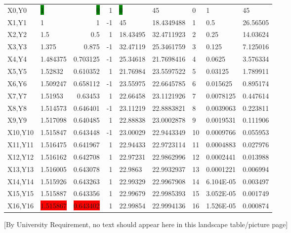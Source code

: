 \begin{landscape}
\begin{table}
\begin{tabular}{|l|l|r|r|l|l|l|l|l|}
    X0,Y0 & \colorbox{green}{1}     & \colorbox{green}{0}     & 1     & \colorbox{green}{0}     & 45    & 0     & 1     & 45 \\
    X1,Y1 & 1     & 1     & -1    & 45    & 18.4349488 & 1     & 0.5   & 26.56505 \\
    X2,Y2 & 1.5   & 0.5   & 1     & 18.43495 & 32.4711923 & 2     & 0.25  & 14.03624 \\
    X3,Y3 & 1.375 & 0.875 & -1    & 32.47119 & 25.3461759 & 3     & 0.125 & 7.125016 \\
    X4,Y4 & 1.484375 & 0.703125 & -1    & 25.34618 & 21.7698416 & 4     & 0.0625 & 3.576334 \\
    X5,Y5 & 1.52832 & 0.610352 & 1     & 21.76984 & 23.5597522 & 5     & 0.03125 & 1.789911 \\
    X6,Y6 & 1.509247 & 0.658112 & -1    & 23.55975 & 22.6645785 & 6     & 0.015625 & 0.895174 \\
    X7,Y7 & 1.51953 & 0.63453 & 1     & 22.66458 & 23.1121926 & 7     & 0.0078125 & 0.447614 \\
    X8,Y8 & 1.514573 & 0.646401 & -1    & 23.11219 & 22.8883821 & 8     & 0.0039063 & 0.223811 \\
    X9,Y9 & 1.517098 & 0.640485 & 1     & 22.88838 & 23.0002878 & 9     & 0.0019531 & 0.111906 \\
    X10,Y10 & 1.515847 & 0.643448 & -1    & 23.00029 & 22.9443349 & 10    & 0.0009766 & 0.055953 \\
    X11,Y11 & 1.516475 & 0.641967 & 1     & 22.94433 & 22.9723114 & 11    & 0.0004883 & 0.027976 \\
    X12,Y12 & 1.516162 & 0.642708 & 1     & 22.97231 & 22.9862996 & 12    & 0.0002441 & 0.013988 \\
    X13,Y13 & 1.516005 & 0.643078 & 1     & 22.9863 & 22.9932937 & 13    & 0.0001221 & 0.006994 \\
    X14,Y14 & 1.515926 & 0.643263 & 1     & 22.99329 & 22.9967908 & 14    & 6.104E-05 & 0.003497 \\
    X15,Y15 & 1.515887 & 0.643356 & 1     & 22.99679 & 22.9985393 & 15    & 3.052E-05 & 0.001749 \\
    X16,Y16 & \colorbox{red}{1.515867} & \colorbox{red}{0.643402} & 1     & 22.99854 & 22.9994136 & 16    & 1.526E-05 & 0.000874 \\
    \bottomrule
    \end{tabular}%

{\small [By University Requirement, no text should appear here in this landscape table/picture page]}
\end{table}
\end{landscape}
